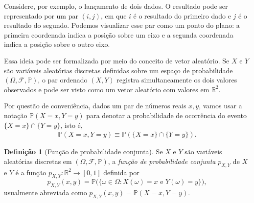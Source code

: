 \documentclass[12pt,portuguese]{article}
\theoremstyle{definition}
\newtheorem{definition}[definition]{Definição}
\begin{document}
Considere, por exemplo, o lançamento de dois dados. O resultado pode ser
representado por um par $(i,j)$, em que $i$ é o resultado do primeiro dado e
$j$ é o resultado do segundo. Podemos visualizar esse par como um ponto do
plano: a primeira coordenada indica a posição sobre um eixo e a segunda
coordenada indica a posição sobre o outro eixo.

Essa ideia pode ser formalizada por meio do conceito de vetor aleatório. 
Se $X$ e $Y$ são
variáveis aleatórias discretas definidas sobre um espaço de probabilidade
$(\Omega,\mathcal{F},\mathbb{P})$, o par ordenado $(X,Y)$ registra simultaneamente os
dois valores observados e pode ser visto como um vetor aleatório com valores
em $\mathbb{R}^2$. 

Por questão de conveniência, dados um par de números reais $x,y$, vamos usar a notação 
$\mathbb{P}(X=x,Y=y)$ para denotar a probabilidade de ocorrência
do evento $\{X=x\} \cap \{Y=y\}$, isto é,
\begin{align*}
\mathbb{P}(X=x,Y=y) \equiv \mathbb{P}(\{X=x\}\cap \{Y=y\}).
\end{align*}

\begin{definition}[Função de probabilidade conjunta]\label{def:funcao-probabilidade-conjunta}
Se $X$ e $Y$ são variáveis aleatórias discretas em
$(\Omega,\mathcal{F},\mathbb{P})$, a \emph{função de probabilidade conjunta}
$p_{X,Y}$ de $X$ e $Y$ é a função $p_{X,Y} : \mathbb{R}^2 \to [0,1]$ definida por
\begin{equation}\label{eq:conjunta-definicao}
  p_{X,Y}(x, y) 
  = 
  \mathbb{P}\bigl(\{\omega \in \Omega : X(\omega) = x \text{ e } Y(\omega) = y\}\bigr),
\end{equation}
usualmente abreviada como $p_{X,Y}(x, y) = \mathbb{P}(X = x, Y = y)$.
\end{definition}
\end{document}

